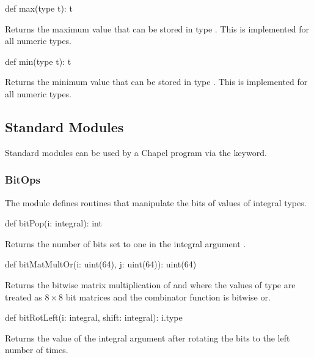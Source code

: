 \begin{protohead}
def max(type t): t
\end{protohead}
\begin{protobody}
Returns the maximum value that can be stored in type .  This
is implemented for all numeric types.
\end{protobody}

\begin{protohead}
def min(type t): t
\end{protohead}
\begin{protobody}
Returns the minimum value that can be stored in type .  This
is implemented for all numeric types.
\end{protobody}



\subsection{Standard Modules}

Standard modules can be used by a Chapel program via the 
keyword.

\subsubsection{BitOps}
\label{BitOps}

The module  defines routines that manipulate the bits of
values of integral types.

\vspace{1pc}

\begin{protohead}
def bitPop(i: integral): int
\end{protohead}
\begin{protobody}
Returns the number of bits set to one in the integral
argument .
\end{protobody}

\begin{protohead}
def bitMatMultOr(i: uint(64), j: uint(64)): uint(64)
\end{protohead}
\begin{protobody}
Returns the bitwise matrix multiplication of  and 
where the values of  type are treated as $8 \times 8$
bit matrices and the combinator function is bitwise or.
\end{protobody}

\begin{protohead}
def bitRotLeft(i: integral, shift: integral): i.type
\end{protohead}
\begin{protobody}
Returns the value of the integral argument  after rotating the
bits to the left  number of times.
\end{protobody}

